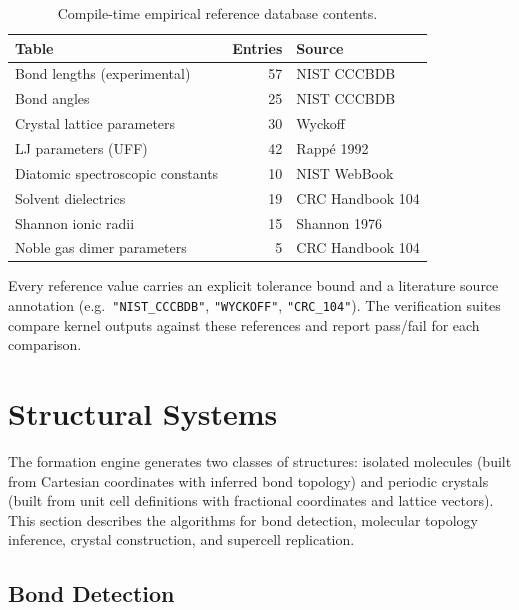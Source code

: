 \documentclass[11pt,twoside]{article}
\begin{document}
\begin{table}[H]
\centering
\caption{Compile-time empirical reference database contents.}
\label{tab:empdb}
\begin{tabular}{lr l}
\toprule
\textbf{Table} & \textbf{Entries} & \textbf{Source} \\
\midrule
Bond lengths (experimental)           & 57  & NIST CCCBDB \\
Bond angles                           & 25  & NIST CCCBDB \\
Crystal lattice parameters            & 30  & Wyckoff \\
LJ parameters (UFF)                   & 42  & Rapp\'{e} 1992 \\
Diatomic spectroscopic constants      & 10  & NIST WebBook \\
Solvent dielectrics                   & 19  & CRC Handbook 104 \\
Shannon ionic radii                   & 15  & Shannon 1976 \\
Noble gas dimer parameters            & 5   & CRC Handbook 104 \\
\bottomrule
\end{tabular}
\end{table}

Every reference value carries an explicit tolerance bound and a literature source annotation (e.g.\ \texttt{"NIST\_CCCBDB"}, \texttt{"WYCKOFF"}, \texttt{"CRC\_104"}). The verification suites compare kernel outputs against these references and report pass/fail for each comparison.


\section{Structural Systems}
\label{sec:structural}

The formation engine generates two classes of structures: isolated molecules (built from Cartesian coordinates with inferred bond topology) and periodic crystals (built from unit cell definitions with fractional coordinates and lattice vectors). This section describes the algorithms for bond detection, molecular topology inference, crystal construction, and supercell replication.

\subsection{Bond Detection}
\end{document}
